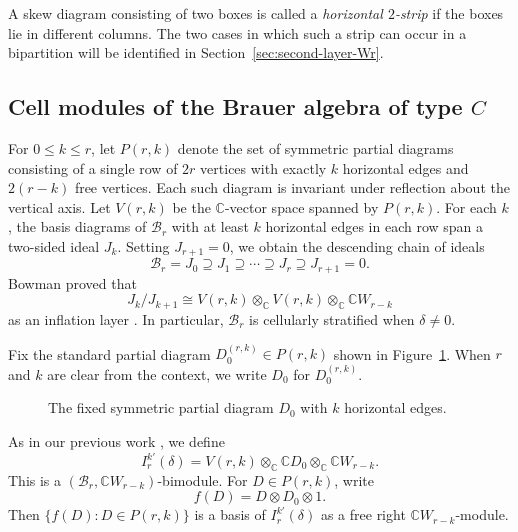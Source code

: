 \documentclass[10pt,a4paper]{amsart}
\newcommand{\C}{\mathbb{C}}
\newcommand{\1}{\mathfrak{1}}
\newcommand{\B}{\mathcal{B}}
\begin{document}
A skew diagram consisting of two boxes is called a \emph{horizontal $2$-strip} if the boxes lie in different columns. The two cases in which such a strip can occur in a bipartition will be identified
in Section~\ref{sec:second-layer-Wr}.

\subsection{Cell modules of the Brauer algebra of type $C$}

For $0\leq k\leq r$, let $P(r,k)$ denote the set of symmetric partial diagrams consisting of a single row of $2r$ vertices with exactly $k$ horizontal edges and $2(r-k)$ free vertices. Each such diagram is invariant under reflection about the vertical axis. Let $V(r,k)$ be the $\C$-vector space spanned by $P(r,k)$. For each $k$, the basis diagrams of $\B_r$ with at least
$k$ horizontal edges in each row span a two-sided ideal $J_k$. Setting $J_{r+1}=0$, we obtain the descending chain of ideals
$$
\B_r=J_0\supseteq J_1\supseteq\cdots\supseteq J_r
\supseteq J_{r+1}=0.
$$
Bowman proved that
\begin{equation}
J_k/J_{k+1}\cong V(r,k)\otimes_{\C}V(r,k)\otimes_{\C}\C W_{r-k}
\label{eq:inflation-layer}
\end{equation}
as an inflation layer \cite{Bo12}. In particular, $\B_r$ is cellularly stratified when $\delta\neq0$.

Fix the standard partial diagram $D_0^{(r,k)}\in P(r,k)$ shown in Figure~\ref{fig:fixed-bottom-partial-diagram}. When $r$ and $k$ are clear from the context, we write $D_0$ for $D_0^{(r,k)}$.
\begin{figure}[H]
\centering
{}
\caption{The fixed symmetric partial diagram $D_0$ with $k$ horizontal edges.}
\label{fig:fixed-bottom-partial-diagram}
\end{figure}
As in our previous work \cite{KCTprevious}, we define
$$
 I_r^{k'}(\delta) =V(r,k)\otimes_{\C}\C D_0\otimes_{\C}\C W_{r-k}.
$$
This is a $(\B_r,\C W_{r-k})$-bimodule. For $D\in P(r,k)$, write
$$
 f(D)=D\otimes D_0\otimes1.
$$
Then $\{f(D):D\in P(r,k)\}$ is a basis of $I_r^{k'}(\delta)$ as a
free right $\C W_{r-k}$-module.
\end{document}
